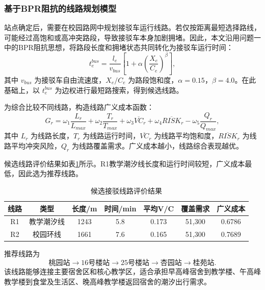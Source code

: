 \documentclass[UTF8,zihao=-4,a4paper]{ctexart}
\begin{document}
\subsubsection{基于BPR阻抗的线路规划模型}

站点确定后，需要在校园路网中规划接驳车运行线路。若仅按距离最短选择路线，可能经过高饱和或高冲突路段，导致接驳车本身加剧拥堵。因此，本文沿用问题一中的BPR阻抗思想，将路段长度和拥堵状态共同转化为接驳车运行时间：
\begin{equation}
t_e^{bus}=\frac{l_e}{v_{bus}}\left[1+\alpha\left(\frac{X_e}{C_e}\right)^\beta\right],
\end{equation}
其中 $v_{bus}$ 为接驳车自由流速度，$X_e/C_e$ 为路段饱和度，$\alpha=0.15$，$\beta=4.0$。在此基础上，以 $t_e^{bus}$ 为边权进行最短路搜索，得到候选线路。

为综合比较不同线路，构造线路广义成本函数：
\begin{equation}
G_r=\omega_1\frac{L_r}{L_{max}}+\omega_2\frac{T_r}{T_{max}}+\omega_3\overline{VC}_r+\omega_4\overline{RISK}_r-\omega_5\frac{Q_r}{Q_{max}},
\end{equation}
其中 $L_r$ 为线路长度，$T_r$ 为线路运行时间，$\overline{VC}_r$ 为线路平均饱和度，$\overline{RISK}_r$ 为线路平均冲突风险，$Q_r$ 为线路覆盖需求。广义成本越小，线路综合表现越优。

候选线路评价结果如表\ref{tab:route_eval}所示。R1教学潮汐线长度和运行时间较短，广义成本最低，因此选为推荐线路。

\begin{table}[H]
\centering
\caption{候选接驳线路评价结果}
\label{tab:route_eval}
\begin{tabular}{ccccccc}
\toprule
\textbf{线路} & \textbf{类型} & \textbf{长度/m} & \textbf{时间/min} & \textbf{平均V/C} & \textbf{覆盖需求} & \textbf{广义成本} \\
\midrule
R1 & 教学潮汐线 & 1243 & 5.8 & 0.173 & 51,300 & 0.6786 \\
R2 & 校园环线 & 1661 & 7.6 & 0.165 & 51,300 & 0.7689 \\
\bottomrule
\end{tabular}
\end{table}

推荐线路为
\begin{equation}
\text{桃园站}\rightarrow\text{16号楼站}\rightarrow\text{25号楼站}\rightarrow\text{杏园站}\rightarrow\text{桂苑站}.
\end{equation}
该线路能够连接主要宿舍区和核心教学区，适合承担早高峰宿舍到教学楼、午高峰教学楼到食堂及生活区、晚高峰教学楼返回宿舍的潮汐出行需求。
\end{document}
